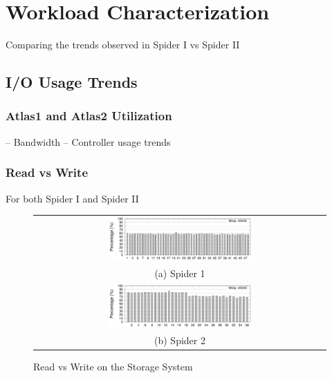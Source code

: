 \section{Workload Characterization}
\label{sec:workloadchar}



Comparing the trends observed in Spider I vs Spider II



\subsection{I/O Usage Trends}



\subsubsection{Atlas1 and Atlas2 Utilization}


-- Bandwidth
-- Controller usage trends

\subsubsection{Read vs Write}
For both Spider I and Spider II

\begin{figure}[!t]
\begin{center}
\begin{tabular}{c}
{\includegraphics[width=0.5\textwidth]{./figs/spider1-wr-ratio.eps}}\\
{(a) Spider 1}\\
{\includegraphics[width=0.5\textwidth]{./figs/spider2-wr-ratio.eps}}\\
{(b) Spider 2}\\
\end{tabular}
\vspace{-0.1in}
\caption{Read vs Write on the Storage System}
\label{fig:rwratio}
\end{center}
\end{figure}


